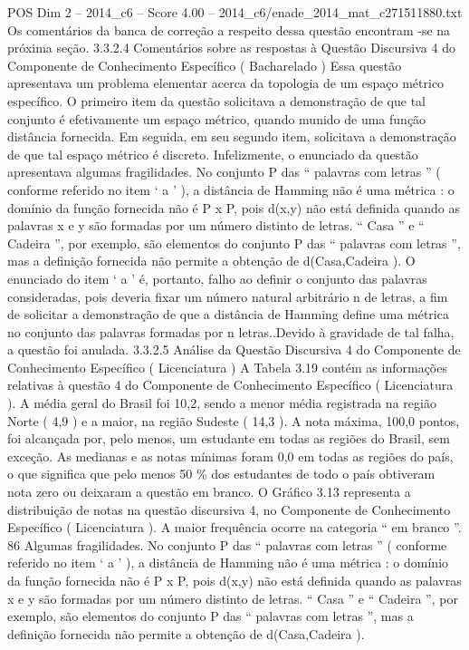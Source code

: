 \begin{textsample}{POS Dim 2 – 2014\_c6 – Score 4.00 – 2014\_c6/enade\_2014\_mat\_c271511880.txt}
Os comentários da banca de correção a respeito dessa questão encontram -se na próxima seção. 3.3.2.4 Comentários sobre as respostas à Questão Discursiva 4 do Componente de Conhecimento Específico ( Bacharelado ) Essa questão apresentava um problema elementar acerca da topologia de um espaço métrico específico.
O primeiro item da questão solicitava a demonstração de que tal conjunto é efetivamente um espaço métrico, quando munido de uma função distância fornecida.
Em seguida, em seu segundo item, solicitava a demonstração de que tal espaço métrico é discreto.
Infelizmente, o enunciado da questão apresentava algumas fragilidades.
No conjunto P das “ palavras com letras ” ( conforme referido no item ‘ a ’ ), a distância de Hamming não é uma métrica : o domínio da função fornecida não é P x P, pois d(x,y) não está definida quando as palavras x e y são formadas por um número distinto de letras. “ Casa ” e “ Cadeira ”, por exemplo, são elementos do conjunto P das “ palavras com letras ”, mas a definição fornecida não permite a obtenção de d(Casa,Cadeira ).
O enunciado do item ‘ a ’ é, portanto, falho ao definir o conjunto das palavras consideradas, pois deveria fixar um número natural arbitrário n de letras, a fim de solicitar a demonstração de que a distância de Hamming define uma métrica no conjunto das palavras formadas por n letras..Devido à gravidade de tal falha, a questão foi anulada. 3.3.2.5 Análise da Questão Discursiva 4 do Componente de Conhecimento Específico ( Licenciatura ) A Tabela 3.19 contém as informações relativas à questão 4 do Componente de Conhecimento Específico ( Licenciatura ).
A média geral do Brasil foi 10,2, sendo a menor média registrada na região Norte ( 4,9 ) e a maior, na região Sudeste ( 14,3 ).
A nota máxima, 100,0 pontos, foi alcançada por, pelo menos, um estudante em todas as regiões do Brasil, sem exceção.
As medianas e as notas mínimas foram 0,0 em todas as regiões do país, o que significa que pelo menos 50 \% dos estudantes de todo o país obtiveram nota zero ou deixaram a questão em branco.
O Gráfico 3.13 representa a distribuição de notas na questão discursiva 4, no Componente de Conhecimento Específico ( Licenciatura ).
A maior frequência ocorre na categoria “ em branco ”. 86 Algumas fragilidades.
No conjunto P das “ palavras com letras ” ( conforme referido no item ‘ a ’ ), a distância de Hamming não é uma métrica : o domínio da função fornecida não é P x P, pois d(x,y) não está definida quando as palavras x e y são formadas por um número distinto de letras. “ Casa ” e “ Cadeira ”, por exemplo, são elementos do conjunto P das “ palavras com letras ”, mas a definição fornecida não permite a obtenção de d(Casa,Cadeira ).

\end{textsample}
